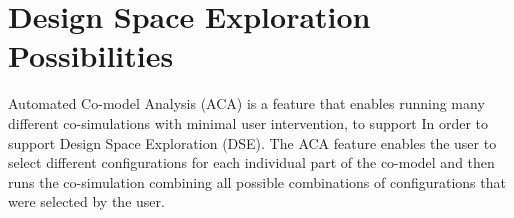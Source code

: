 \documentclass{crescendorepchap}
\newcommand{\url}[1]{\texttt{#1}}
\begin{document}







\chapter{Design Space Exploration Possibilities}\label{chap:DSE}

Automated Co-model Analysis (ACA) is a feature that enables running many different
co-simulations with minimal user intervention, to support In order to support Design Space Exploration (DSE). The ACA feature enables
the user to select different configurations for each individual part of
the co-model and then runs the co-simulation combining all possible combinations of
configurations that were selected by the user.
\end{document}
